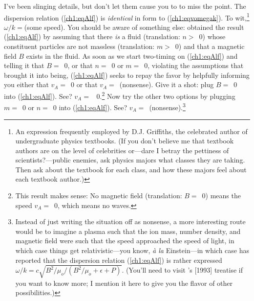 I've been slinging details, but don't let them cause you to to miss the
point. The dispersion relation (\ref{ch1:eqAlf}) is \emph{identical} in form to
(\ref{ch1:eqvomegak}). To wit,\footnote{An expression frequently employed by
  D.J. Griffiths, the celebrated author of undergraduate physics textbooks. (If
  you don't believe me that textbook authors are on the level of celebrities
  or---dare I betray the pettiness of scientists?---public enemies, ask physics
  majors what classes they are taking. Then ask about the textbook for each
  class, and how these majors feel about each textbook author.)}
$ \omega / k = $(some speed). You should be aware of something else: \Alf
obtained the result (\ref{ch1:eqAlf}) by assuming that there \emph{is} a fluid
(translation: $n >$~0) whose constituent particles are not massless
(translation: $m >$~0) and that a magnetic field $B$ exists in the fluid. As
soon as we start two-timing on (\ref{ch1:eqAlf}) and telling it that
$B =$~0, or that $n =$~0 or $m =$~0, violating the assumptions that brought it
into being, (\ref{ch1:eqAlf}) seeks to repay the favor by helpfully
informing you either that $v_A =$~0 or that $v_A =$~(nonsense). Give it a shot:
plug $B =$~0 into (\ref{ch1:eqAlf}). See? $v_A =$~ 0.\footnote{This result makes
  sense: No magnetic field (translation: $B =$~0) means the \Alf speed
  $v_A =$~0, which means no \Alf waves.}  Now try the other two options by
plugging $m =$~0 or $n =$~0 into (\ref{ch1:eqAlf}). See?
$v_A =$~(nonsense).\footnote{Instead of just writing the situation off as
  nonsense, a more interesting route would be to imagine a plasma such that the
  ion mass, number density, and magnetic field were such that the \Alf speed
  approached the speed of light, in which case things get relativistic---you
  know, \textit{\`{a} la} Einstein---in which case \citet{Gedalin1993} has
  reported that the dispersion relation (\ref{ch1:eqAlf}) is rather expressed
  $\omega / k = c \sqrt{B^2/\mu_o / (B^2/\mu_o + \epsilon + P)}$. (You'll need
  to visit \citeauthor{Gedalin1993}'s [1993] treatise if you want to know more;
  I mention it here to give you the flavor of other
  possibilities.)}%

